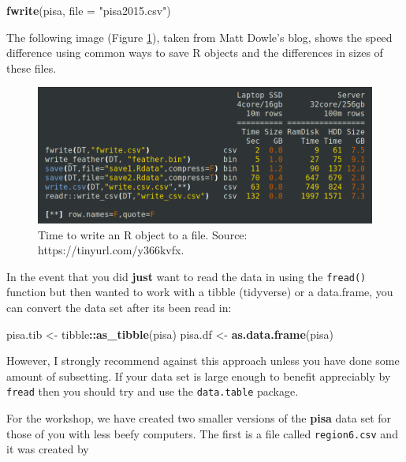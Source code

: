 \documentclass[]{book}
\newenvironment{Shaded}{\begin{snugshade}}{\end{snugshade}}
\newcommand{\DataTypeTok}[1]{\textcolor[rgb]{0.13,0.29,0.53}{#1}}
\newcommand{\KeywordTok}[1]{\textcolor[rgb]{0.13,0.29,0.53}{\textbf{#1}}}
\newcommand{\NormalTok}[1]{#1}
\newcommand{\OperatorTok}[1]{\textcolor[rgb]{0.81,0.36,0.00}{\textbf{#1}}}
\newcommand{\StringTok}[1]{\textcolor[rgb]{0.31,0.60,0.02}{#1}}
\begin{document}
\begin{Shaded}
\begin{Highlighting}[]
\KeywordTok{fwrite}\NormalTok{(pisa, }\DataTypeTok{file =} \StringTok{"pisa2015.csv"}\NormalTok{)}
\end{Highlighting}
\end{Shaded}

The following image (Figure \ref{fig:dtcomp}), taken from Matt Dowle's blog, shows the speed difference using common ways to save R objects and the differences in sizes of these files.

\begin{figure}
\includegraphics[width=0.8\linewidth]{images/dtcomp} \caption{Time to write an R object to a file. Source: https://tinyurl.com/y366kvfx.}\label{fig:dtcomp}
\end{figure}

In the event that you did \textbf{just} want to read the data in using the \texttt{fread()} function but then wanted to work with a tibble (tidyverse) or a data.frame, you can convert the data set after its been read in:

\begin{Shaded}
\begin{Highlighting}[]
\NormalTok{pisa.tib <-}\StringTok{ }\NormalTok{tibble}\OperatorTok{::}\KeywordTok{as_tibble}\NormalTok{(pisa)}
\NormalTok{pisa.df <-}\StringTok{ }\KeywordTok{as.data.frame}\NormalTok{(pisa)}
\end{Highlighting}
\end{Shaded}

However, I strongly recommend against this approach unless you have done some amount of subsetting. If your data set is large enough to benefit appreciably by \texttt{fread} then you should try and use the \texttt{data.table} package.

For the workshop, we have created two smaller versions of the \textbf{pisa} data set for those of you with less beefy computers. The first is a file called \texttt{region6.csv} and it was created by
\end{document}
